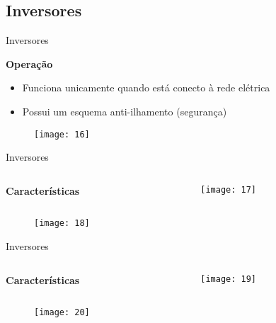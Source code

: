 
\subsection{Inversores}

\begin{frame}{Inversores}

\textbf{Operação}
\begin{itemize}
\item Funciona unicamente quando está conecto à rede elétrica

\item Possui um esquema anti-ilhamento (segurança)
\end{itemize}
 
\begin{figure}[H]
\texttt{[image: 16]}
\end{figure}

\end{frame}

\begin{frame}{Inversores}

\begin{columns}[T]
    \begin{column}{0.5\textwidth}
    \vspace{.5cm}
    	\textbf{Características}
    \end{column}
    \begin{column}{0.5\textwidth}
    	\centering
      	\texttt{[image: 17]}
    \end{column}
\end{columns}
 
\begin{figure}[H]
\texttt{[image: 18]}
\end{figure}

\end{frame}

\begin{frame}{Inversores}

\begin{columns}[T]
    \begin{column}{0.5\textwidth}
    \vspace{.5cm}
    	\textbf{Características}
    \end{column}
    \begin{column}{0.5\textwidth}
    	\centering
      	\texttt{[image: 19]}
    \end{column}
\end{columns}
 
\begin{figure}[H]
\texttt{[image: 20]}
\end{figure}

\end{frame}


